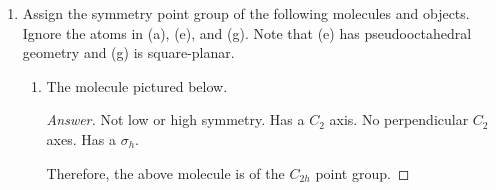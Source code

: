 \documentclass[../psets.tex]{subfiles}
\begin{document}
\begin{enumerate}[label={\Roman*)}]
\begin{enumerate}[label={\textbf{3.\arabic*}}]
\begin{enumerate}[label={\textbf{\alph*.}}]
\begin{proof}[Answer]
                Therefore,  is of the $C_{4v}$ point group.
            \end{proof}
            \item {}
            \begin{proof}[Answer]
                 is of the $C_s$ point group.
            \end{proof}
            \item {}
            \begin{proof}[Answer]
                Not low or high symmetry. Has a $C_4$ axis. No perpendicular $C_2$ axes. No $\sigma_h$. Has two perpendicular $\sigma_v$ planes and two perpendicular $\sigma_d$ planes.\par
                Therefore,  is of the $C_{4v}$ point group.
            \end{proof}
            \item {}
            \begin{proof}[Answer]
                Not low or high symmetry. Has a $C_2$ axis. No perpendicular $C_2$ axes. No $\sigma_h$. Has two perpendicular $\sigma_v$ planes.\par
                Therefore,  is of the $C_{2v}$ point group.
            \end{proof}
        \end{enumerate}
    \end{enumerate}
    \newpage
    \item Assign the symmetry point group of the following molecules and objects. Ignore the  atoms in (a), (e), and (g). Note that (e) has pseudooctahedral geometry and (g) is square-planar.
    \begin{enumerate}[label={\alph*)}]
        \item The molecule pictured below.
        \begin{center}
            \vspace{1em}
            \vspace{1em}
        \end{center}
        \begin{proof}[Answer]
            Not low or high symmetry. Has a $C_2$ axis. No perpendicular $C_2$ axes. Has a $\sigma_h$.\par
            Therefore, the above molecule is of the $C_{2h}$ point group.
        \end{proof}

\end{enumerate}
\end{enumerate}
\end{document}
